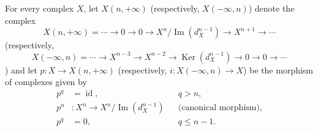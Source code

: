 For every complex $X$, let $X(n,+\infty)$ (respectively, $X(-\infty,n)$)
denote the complex
\[
X(n,+\infty)=\cdots\longrightarrow0\longrightarrow0
\longrightarrow X^n/\operatorname{Im}(d_X^{n-1})
\longrightarrow X^{n+1}\longrightarrow\cdots
\]
(respectively,
\[
X(-\infty,n)=\cdots\longrightarrow X^{n-3}\longrightarrow X^{n-2}
\longrightarrow\operatorname{Ker}(d_X^{n-1})
\longrightarrow0\longrightarrow0\longrightarrow\cdots
\])
and let $p\colon X\longrightarrow X(n,+\infty)$ (respectively,
$i\colon X(-\infty,n)\longrightarrow X$) be the morphism of complexes
given by
\[
\begin{aligned}
p^q&=\operatorname{id},&&q>n,\\
p^n&\colon X^n\longrightarrow X^n/\operatorname{Im}(d_X^{n-1})
  &&\text{(canonical morphism)},\\
p^q&=0,&&q\leq n-1.
\end{aligned}
\]
\endgroup
